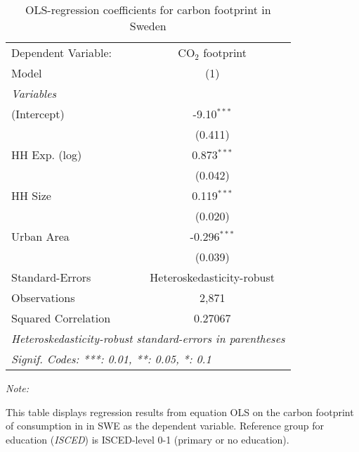 
\begin{table}[htbp!]
   \centering
   \small
   \begin{adjustbox}{width = 1\textwidth, max height = 0.95\textheight, center}
      \begin{threeparttable}[b]
         \caption{\label{tab:OLS_2_SWE} OLS-regression coefficients for carbon footprint in Sweden}
         \begin{tabular}{lc}
            \tabularnewline \midrule \midrule
            Dependent Variable: & CO$_{2}$ footprint\\  
            Model               & (1)\\  
            \midrule
            \emph{Variables}\\
            (Intercept)         & -9.10$^{***}$\\   
                                & (0.411)\\   
            HH Exp. (log)       & 0.873$^{***}$\\   
                                & (0.042)\\   
            HH Size             & 0.119$^{***}$\\   
                                & (0.020)\\   
            Urban Area          & -0.296$^{***}$\\   
                                & (0.039)\\   
            \midrule 
            Standard-Errors     & Heteroskedasticity-robust \\   
            Observations        & 2,871\\  
            Squared Correlation & 0.27067\\  
            \midrule \midrule
            \multicolumn{2}{l}{\emph{Heteroskedasticity-robust standard-errors in parentheses}}\\
            \multicolumn{2}{l}{\emph{Signif. Codes: ***: 0.01, **: 0.05, *: 0.1}}\\
         \end{tabular}
         
         \begin{tablenotes}\item \medskip \textit{Note:}
            \item This table displays regression results from equation OLS on the carbon footprint of consumption in  in SWE as the dependent variable.  Reference group for education (\textit{ISCED}) is ISCED-level 0-1 (primary or no education).
         \end{tablenotes}
      \end{threeparttable}
   \end{adjustbox}
\end{table}



